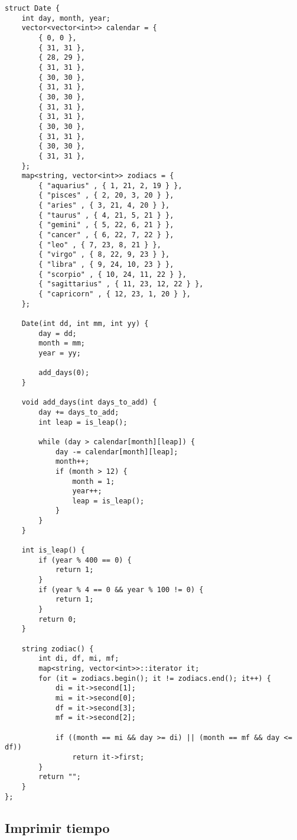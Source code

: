 \documentclass[10pt]{article}
\begin{document}
\begin{lstlisting}
struct Date {
    int day, month, year;
    vector<vector<int>> calendar = {
        { 0, 0 },
        { 31, 31 },
        { 28, 29 },
        { 31, 31 },
        { 30, 30 },
        { 31, 31 },
        { 30, 30 },
        { 31, 31 },
        { 31, 31 },
        { 30, 30 },
        { 31, 31 },
        { 30, 30 },
        { 31, 31 },
    };
    map<string, vector<int>> zodiacs = {
        { "aquarius" , { 1, 21, 2, 19 } },
        { "pisces" , { 2, 20, 3, 20 } },
        { "aries" , { 3, 21, 4, 20 } },
        { "taurus" , { 4, 21, 5, 21 } },
        { "gemini" , { 5, 22, 6, 21 } },
        { "cancer" , { 6, 22, 7, 22 } },
        { "leo" , { 7, 23, 8, 21 } },
        { "virgo" , { 8, 22, 9, 23 } },
        { "libra" , { 9, 24, 10, 23 } },
        { "scorpio" , { 10, 24, 11, 22 } },
        { "sagittarius" , { 11, 23, 12, 22 } },
        { "capricorn" , { 12, 23, 1, 20 } },
    };

    Date(int dd, int mm, int yy) {
        day = dd;
        month = mm;
        year = yy;

        add_days(0);
    }

    void add_days(int days_to_add) {
        day += days_to_add;
        int leap = is_leap();

        while (day > calendar[month][leap]) {
            day -= calendar[month][leap];
            month++;
            if (month > 12) {
                month = 1;
                year++;
                leap = is_leap();
            }
        }
    }

    int is_leap() {
        if (year % 400 == 0) {
            return 1;
        }
        if (year % 4 == 0 && year % 100 != 0) {
            return 1;
        }
        return 0;
    }

    string zodiac() {
        int di, df, mi, mf;
        map<string, vector<int>>::iterator it;
        for (it = zodiacs.begin(); it != zodiacs.end(); it++) {
            di = it->second[1];
            mi = it->second[0];
            df = it->second[3];
            mf = it->second[2];

            if ((month == mi && day >= di) || (month == mf && day <= df))
                return it->first;
        }
        return "";
    }
};
\end{lstlisting}

\subsection{Imprimir tiempo}
\end{document}
